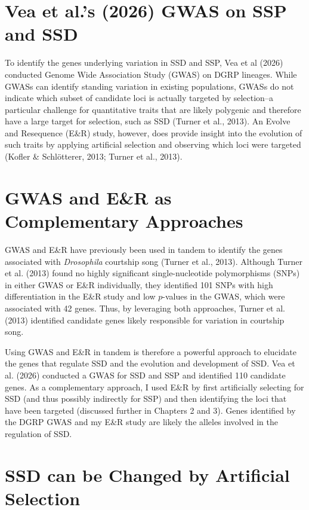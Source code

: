 \documentclass[12pt,reqno,oneside]{report}
\begin{document}
\section{Vea et al.'s (2026) GWAS on SSP and SSD}

To identify the genes underlying variation in SSD and SSP, Vea et al (2026) conducted Genome Wide Association Study (GWAS) on DGRP lineages. While GWASs can identify standing variation in existing populations, GWASs do not indicate which subset of candidate loci is actually targeted by selection--a particular challenge for quantitative traits that are likely polygenic and therefore have a large target for selection, such as SSD (Turner et al., 2013). An Evolve and Resequence (E\&R) study, however, does provide insight into the evolution of such traits by applying artificial selection and observing which loci were targeted (Kofler \& Schlötterer, 2013; Turner et al., 2013).

\section{GWAS and E\&R as Complementary Approaches}

GWAS and E\&R have previously been used in tandem to identify the genes associated with \textit{Drosophila} courtship song (Turner et al., 2013). Although Turner et al. (2013) found no highly significant single-nucleotide polymorphisms (SNPs) in either GWAS or E\&R individually, they identified 101 SNPs with high differentiation in the E\&R study and low \(p\)-values in the GWAS, which were associated with 42 genes. Thus, by leveraging both approaches, Turner et al. (2013) identified candidate genes likely responsible for variation in courtship song.

Using GWAS and E\&R in tandem is therefore a powerful approach to elucidate the genes that regulate SSD and the evolution and development of SSD. Vea et al. (2026) conducted a GWAS for SSD and SSP and identified 110 candidate genes. As a complementary approach, I used E\&R by first artificially selecting for SSD (and thus possibly indirectly for SSP) and then identifying the loci that have been targeted (discussed further in Chapters 2 and 3). Genes identified by the DGRP GWAS and my E\&R study are likely the alleles involved in the regulation of SSD. %

\section{SSD can be Changed by Artificial Selection}
\end{document}
